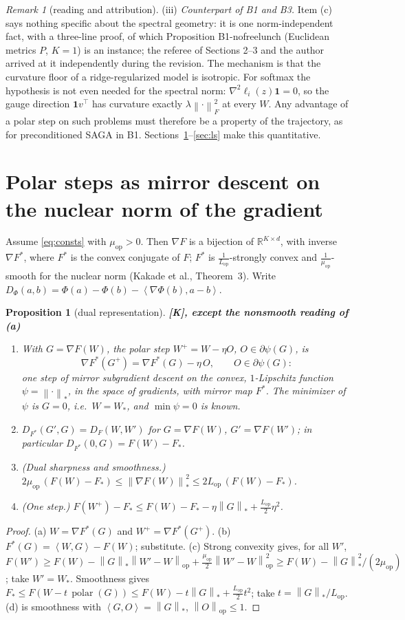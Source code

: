 \documentclass[11pt]{article}
\newtheorem{proposition}[theorem]{Proposition}
\theoremstyle{definition}
\theoremstyle{remark}
\newtheorem{remark}[theorem]{Remark}
\newcommand{\R}{\mathbb{R}}
\newcommand{\nop}[1]{\left\|#1\right\|_{\mathrm{op}}}
\newcommand{\nnuc}[1]{\left\|#1\right\|_{*}}
\newcommand{\nF}[1]{\left\|#1\right\|_{F}}
\newcommand{\inner}[2]{\left\langle #1, #2 \right\rangle}
\newcommand{\polar}{\operatorname{polar}}
\newcommand{\Lop}{L_{\mathrm{op}}}
\newcommand{\muop}{\mu_{\mathrm{op}}}
\newcommand{\ones}{\mathbf{1}}
\begin{document}
\begin{remark}[reading and attribution]
(iii) \emph{Counterpart of B1 and B3.} Item (c) says nothing specific about the spectral geometry: it is one
norm-independent fact, with a three-line proof, of which Proposition B1-nofreelunch (Euclidean metrics $P$, $K=1$) is
an instance; the referee of Sections 2--3 and the author arrived at it independently during the revision. The mechanism
is that the curvature floor of a ridge-regularized model is isotropic. For softmax the hypothesis is not even needed for
the spectral norm: $\nabla^2\ell_i(z)\ones=0$, so the gauge direction $\ones v^\top$ has curvature exactly
$\lambda\nF\cdot^2$ at every $W$. Any advantage of a polar step on such problems must therefore be a property of the
trajectory, as for preconditioned SAGA in B1. Sections~\ref{sec:dual}--\ref{sec:ls} make this quantitative.
\end{remark}

\section{Polar steps as mirror descent on the nuclear norm of the gradient}\label{sec:dual}

Assume \eqref{eq:consts} with $\muop>0$. Then $\nabla F$ is a bijection of $\R^{K\times d}$, with inverse
$\nabla F^\ast$, where $F^\ast$ is the convex conjugate of $F$; $F^\ast$ is $\frac1{\Lop}$-strongly convex and
$\frac1{\muop}$-smooth for the nuclear norm (Kakade et al., Theorem~3). Write
$D_\Phi(a,b)=\Phi(a)-\Phi(b)-\inner{\nabla\Phi(b)}{a-b}$.

\begin{proposition}[dual representation]\label{prop:dual} \textbf{[K], except the nonsmooth reading of (a)}
\begin{enumerate}[label=(\alph*)]
\item With $G=\nabla F(W)$, the polar step $W^+=W-\eta O$, $O\in\partial\psi(G)$, is
\[
\nabla F^\ast(G^+)=\nabla F^\ast(G)-\eta\,O,\qquad O\in\partial\psi(G):
\]
one step of mirror \emph{subgradient} descent on the convex, $1$-Lipschitz function $\psi=\nnuc\cdot$, in the space of
gradients, with mirror map $F^\ast$. The minimizer of $\psi$ is $G=0$, i.e.\ $W=W_\ast$, and $\min\psi=0$ is known.
\item $D_{F^\ast}(G',G)=D_F(W,W')$ for $G=\nabla F(W)$, $G'=\nabla F(W')$; in particular $D_{F^\ast}(0,G)=F(W)-F_\ast$.
\item (Dual sharpness and smoothness.) $2\muop\,(F(W)-F_\ast)\le\nnuc{\nabla F(W)}^2\le2\Lop\,(F(W)-F_\ast)$.
\item (One step.) $F(W^+)-F_\ast\le F(W)-F_\ast-\eta\nnuc G+\frac{\Lop}2\eta^2$.
\end{enumerate}
\end{proposition}
\begin{proof}
(a) $W=\nabla F^\ast(G)$ and $W^+=\nabla F^\ast(G^+)$. (b) $F^\ast(G)=\inner WG-F(W)$; substitute. (c) Strong convexity
gives, for all $W'$, $F(W')\ge F(W)-\nnuc G\nop{W'-W}+\frac{\muop}2\nop{W'-W}^2\ge F(W)-\nnuc G^2/(2\muop)$; take
$W'=W_\ast$. Smoothness gives $F_\ast\le F(W-t\,\polar(G))\le F(W)-t\nnuc G+\frac{\Lop}2t^2$; take $t=\nnuc G/\Lop$. (d) is
smoothness with $\inner GO=\nnuc G$, $\nop O\le1$.
\end{proof}
\end{document}
